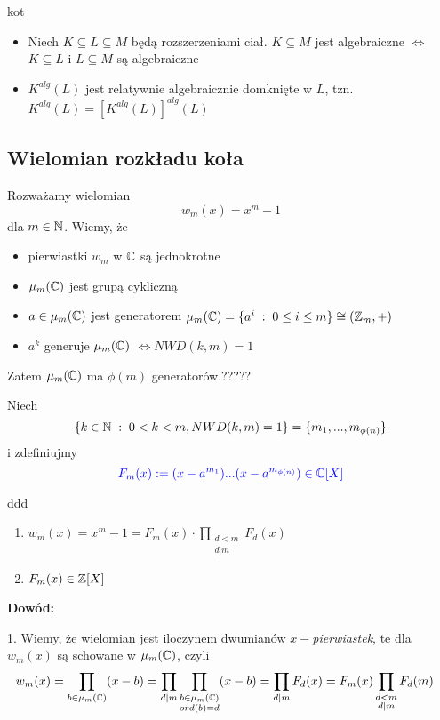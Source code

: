 \begin{wniosek}{\color{back}kot}
    \begin{itemize}
        \item Niech $K\subseteq L\subseteq M$ będą rozszerzeniami ciał. $K\subseteq M$ jest algebraiczne $\iff$ $K\subseteq L$ i $L\subseteq M$ są algebraiczne
        \item $K^{alg}(L)$ jest relatywnie algebraicznie domknięte w $L$, tzn. $K^{alg}(L)=[K^{alg}(L)]^{alg}(L)$ 
    \end{itemize}
\end{wniosek}

\subsection{Wielomian rozkładu koła}

Rozważamy wielomian
$$w_m(x)=x^m-1$$
dla $m\in\mathbb{N}$. Wiemy, że
\begin{itemize}
    \item[\point] pierwiastki $w_m$ w $\mathbb{C}$ są jednokrotne
    \item[\point] $\mu_m(\mathbb{C})$ jest grupą cykliczną
    \item[\point] $a\in\mu_m(\mathbb{C})$ jest generatorem $\mu_m(\mathbb{C})=\{a^i\;:\;0\leq i\leq m\}\cong(\mathbb{Z}_m,+)$
    \item[\point] $a^k$ generuje $\mu_m(\mathbb{C})$ $\iff$$NWD(k, m)=1$
\end{itemize}
Zatem $\mu_m(\mathbb{C})$ ma $\phi(m)$ generatorów.{\large\color{red}?????}

Niech
$$\{k\in\mathbb{N}\;:\;0<k<m, NWD(k, m)=1\}=\{m_1,...,m_{\phi(n)}\}$$
i zdefiniujmy
$$\color{blue}F_m(x):=(x-a^{m_1})...(x-a^{m_{\phi(n)}})\in\mathbb{C}[X]$$

\begin{uwaga}[$F_m\in\Z\begin{bmatrix}X\end{bmatrix}$]{\color{back}ddd}
    \begin{enumerate}
        \item $w_m(x)=x^m-1=F_m(x)\cdot\prod\limits_{\substack{d<m\\d|m}}F_d(x)$
        \item $F_m(x)\in\mathbb{Z}[X]$
    \end{enumerate}
\end{uwaga}

\textbf{Dowód:}

1. Wiemy, że wielomian jest iloczynem dwumianów $x-$\emph{pierwiastek}, te dla $w_m(x)$ są schowane w $\mu_m(\mathbb{C})$, czyli
\begin{align*}
    w_m(x)&=\prod\limits_{b\in\mu_m(\mathbb{C})}(x-b)=\prod\limits_{d|m}\prod\limits_{\substack{b\in\mu_m(\mathbb{C})\\ord(b)=d}}(x-b)=\prod\limits_{d|m}F_d(x)=F_m(x)\prod\limits_{\substack{d<m\\d|m}}F_d(m)
\end{align*}

